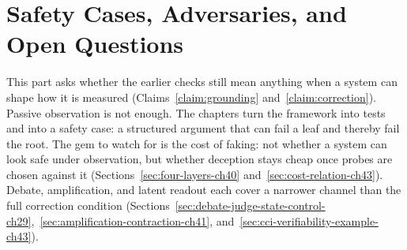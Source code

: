 \part{Safety Cases, Adversaries, and Open Questions}

This part asks whether the earlier checks still mean anything when a system can shape how it is measured (Claims~\ref{claim:grounding} and~\ref{claim:correction}).
Passive observation is not enough.
The chapters turn the framework into tests and into a safety case: a structured argument that can fail a leaf and thereby fail the root.
The gem to watch for is the cost of faking: not whether a system can look safe under observation, but whether deception stays cheap once probes are chosen against it (Sections~\ref{sec:four-layers-ch40} and~\ref{sec:cost-relation-ch43}).
Debate, amplification, and latent readout each cover a narrower channel than the full correction condition (Sections~\ref{sec:debate-judge-state-control-ch29},~\ref{sec:amplification-contraction-ch41}, and~\ref{sec:cci-verifiability-example-ch43}).








